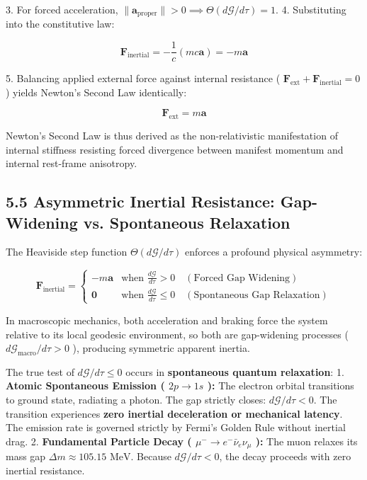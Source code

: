 \documentclass[11pt,a4paper]{article}
\theoremstyle{definition}\newtheorem{definition}{Definition}
\theoremstyle{remark}\newtheorem{remark}{Remark}
\begin{document}
3. For forced acceleration, $\|\mathbf{a}_{\text{proper}}\| > 0 \implies \Theta(d\mathcal{G}/d\tau) = 1$.
4. Substituting into the constitutive law:


\begin{equation}
\mathbf{F}_{\text{inertial}} = -\frac{1}{c} (m c \mathbf{a}) = -m\mathbf{a}
\end{equation}


5. Balancing applied external force against internal resistance ( $\mathbf{F}_{\text{ext}} + \mathbf{F}_{\text{inertial}} = 0$ ) yields Newton's Second Law identically:


\begin{equation}
\mathbf{F}_{\text{ext}} = m\mathbf{a}
\end{equation}


Newton's Second Law is thus derived as the non-relativistic manifestation of internal stiffness resisting forced divergence between manifest momentum and internal rest-frame anisotropy.
\subsection{5.5 Asymmetric Inertial Resistance: Gap-Widening vs. Spontaneous Relaxation}

The Heaviside step function $\Theta(d\mathcal{G}/d\tau)$ enforces a profound physical asymmetry:


\begin{equation}
\mathbf{F}_{\text{inertial}} = \begin{cases} -m\mathbf{a} & \text{when } \frac{d\mathcal{G}}{d\tau} > 0 \quad (\text{Forced Gap Widening}) \\[6pt] \mathbf{0} & \text{when } \frac{d\mathcal{G}}{d\tau} \le 0 \quad (\text{Spontaneous Gap Relaxation}) \end{cases}
\end{equation}


In macroscopic mechanics, both acceleration and braking force the system relative to its local geodesic environment, so both are gap-widening processes ( $d\mathcal{G}_{\text{macro}}/d\tau > 0$ ), producing symmetric apparent inertia.

The true test of $d\mathcal{G}/d\tau \le 0$ occurs in \textbf{spontaneous quantum relaxation}:
1. \textbf{Atomic Spontaneous Emission ( $2p \to 1s$ ):} The electron orbital transitions to ground state, radiating a photon. The gap strictly closes: $d\mathcal{G}/d\tau < 0$. The transition experiences \textbf{zero inertial deceleration or mechanical latency}. The emission rate is governed strictly by Fermi's Golden Rule without inertial drag.
2. \textbf{Fundamental Particle Decay ( $\mu^- \to e^- \bar{\nu}_e \nu_\mu$ ):} The muon relaxes its mass gap $\Delta m \approx 105.15\text{ MeV}$. Because $d\mathcal{G}/d\tau < 0$, the decay proceeds with zero inertial resistance.
\end{document}
